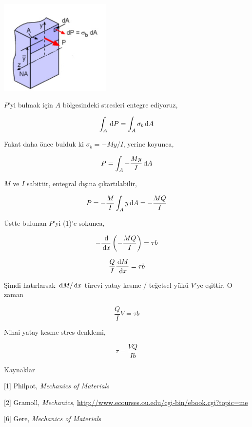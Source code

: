 \documentclass[12pt,fleqn]{article}\usepackage{../../common}
\begin{document}
\includegraphics[width=15em]{phy_020_strs_00_01.jpg}

$P$'yi bulmak için $A$ bölgesindeki stresleri entegre ediyoruz,

$$
\int_A \,\mathrm{d} P = \int_A \sigma_b \,\mathrm{d} A
$$

Fakat daha önce bulduk ki $\sigma_b = -My / I$, yerine koyunca,

$$
P = \int_A - \frac{My}{I} \,\mathrm{d} A
$$

$M$ ve $I$ sabittir, entegral dışına çıkartılabilir,

$$
P = - \frac{M}{I} \int_A y \,\mathrm{d} A = - \frac{MQ}{I}
$$

Üstte bulunan $P$'yi (1)'e sokunca,

$$
- \frac{\,\mathrm{d}}{\,\mathrm{d} x} \left( - \frac{MQ}{I} \right) = \tau b
$$

$$
\frac{Q}{I} \frac{\,\mathrm{d} M}{\,\mathrm{d} x} = \tau b
$$

Şimdi hatırlarsak $\,\mathrm{d} M/\,\mathrm{d} x$ türevi yatay kesme / teğetsel yükü $V$'ye
eşittir. O zaman

$$
\frac{Q}{I} V = \tau b
$$

Nihai yatay kesme stres denklemi,

$$
\tau = \frac{V Q}{I b}
$$

Kaynaklar

[1] Philpot, {\em Mechanics of Materials}

[2] Gramoll, {\em Mechanics},
    \url{http://www.ecourses.ou.edu/cgi-bin/ebook.cgi?topic=me}

[6] Gere, {\em Mechanics of Materials}
\end{document}
